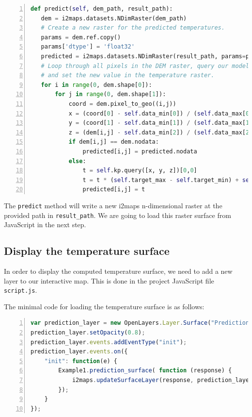 \documentclass[11pt]{article}
\begin{document}
\begin{lstlisting}[language=Python, numbers=left, numberstyle=\footnotesize, numbersep=5pt]
def predict(self, dem_path, result_path):
   dem = i2maps.datasets.NDimRaster(dem_path)
   # Create a new raster for the predicted temperatures.
   params = dem.ref.copy()
   params['dtype'] = 'float32'
   predicted = i2maps.datasets.NDimRaster(result_path, params=params)
   # Loop through all pixels in the DEM raster, query our model,
   # and set the new value in the temperature raster.
   for i in range(0, dem.shape[0]):
       for j in range(0, dem.shape[1]):
           coord = dem.pixel_to_geo((i,j))
           x = (coord[0] - self.data_min[0]) / (self.data_max[0] - self.data_min[0])
           y = (coord[1] - self.data_min[1]) / (self.data_max[1] - self.data_min[1])
           z = (dem[i,j] - self.data_min[2]) / (self.data_max[2] - self.data_min[2])
           if dem[i,j] == dem.nodata:
               predicted[i,j] = predicted.nodata
           else:
               t = self.kp.query([x, y, z])[0,0]
               t = t * (self.target_max - self.target_min) + self.target_min
               predicted[i,j] = t
\end{lstlisting}

The \texttt{predict} method will write a new i2maps n-dimensional raster at the provided path in \texttt{result\_path}. We are going to load this raster surface from JavaScript in the next step.




\subsection{Display the temperature surface}

In order to display the computed temperature surface, we need to add a new layer to our interactive map. This is done in the project JavaScript file \texttt{script.js}.

The minimal code for loading the temperature surface is as follows:

\begin{lstlisting}[language=JavaScript, numbers=left, numberstyle=\footnotesize, numbersep=5pt]
var prediction_layer = new OpenLayers.Layer.Surface("Prediction Surface", {})
prediction_layer.setOpacity(0.8);
prediction_layer.events.addEventType("init");
prediction_layer.events.on({
    "init": function(e) {
        Example1.prediction_surface( function (response) {
            i2maps.updateSurfaceLayer(response, prediction_layer);
        });
    }
});
\end{lstlisting}
\end{document}
